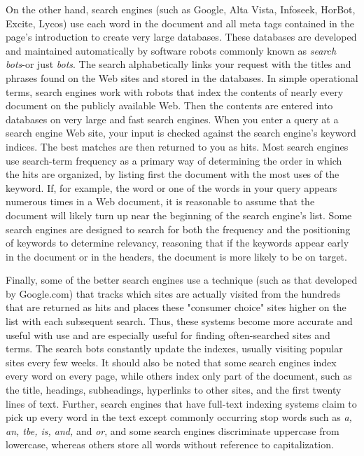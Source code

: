 \documentclass{article}
\begin{document}
On the other hand, search engines (such as Google, Alta Vista, Infoseek, HorBot, Excite, Lycos) use each word in the document and all meta tags contained in the page's introduction to create very large databases. These databases are developed and maintained automatically by software robots commonly known as \textit{search bots}-or just \textit{bots}. The search alphabetically links your request with the titles and phrases found on the Web sites and stored in the databases. In simple operational terms, search engines work with robots that index the contents of nearly every document on the publicly available Web. Then the contents are entered into databases on very large and fast search engines. When you enter a query at a search engine Web site, your input is checked against the search engine's keyword indices. The best matches are then returned to you as hits. Most search engines use search-term frequency as a primary way of determining the order in which the hits are organized, by listing first the document with the most uses of the keyword. If, for example, the word or one of the words in your query appears numerous times in a Web document, it is reasonable to assume that the document will likely turn up near the beginning of the search engine's list. Some search engines are designed to search for both the frequency and the positioning of keywords to determine relevancy, reasoning that if the keywords appear early in the document or in the headers, the document is more likely to be on target.

Finally, some of the better search engines use a technique (such as that developed by Google.com) that tracks which sites are actually visited from the hundreds that are returned as hits and places these "consumer choice" sites higher on the list with each subsequent search. Thus, these systems become more accurate and useful with use and are especially useful for finding often-searched sites and terms. The search bots constantly update the indexes, usually visiting popular sites every few weeks. It should also
be noted that some search engines index every word on every page, while others index only part of the document, such as the title, headings, subheadings, hyperlinks to other sites, and the first twenty lines of text. Further, search engines that have full-text indexing systems claim to pick up every word in the text except commonly occurring stop words such as \textit{a, an, tbe, is, and,} and \textit{or}, and some search engines discriminate uppercase from lowercase, whereas others store all words without reference to capitalization.
\end{document}

